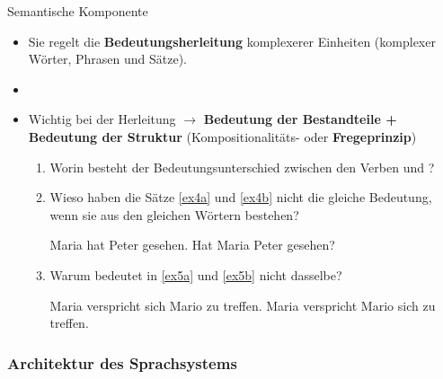 \begin{frame}{Semantische Komponente}
	
	\begin{itemize}
		\item Sie regelt die \textbf{Bedeutungsherleitung} komplexerer Einheiten (komplexer Wörter, Phrasen und Sätze).
		\item[]
		\item<2-> Wichtig bei der Herleitung $\rightarrow$ \textbf{Bedeutung der Bestandteile + Bedeutung der Struktur} (Kompositionalitäts- oder \textbf{Fregeprinzip})
				
		\begin{enumerate}
			\item<3->[$\rightarrow$] Worin besteht der Bedeutungsunterschied zwischen den Verben  und ?
			\item<4->[$\rightarrow$] Wieso haben die Sätze \ref{ex4a} und \ref{ex4b} nicht die gleiche Bedeutung, wenn sie aus den gleichen Wörtern bestehen?

\eal	
	\ex Maria hat Peter gesehen. \label{ex4a}
	\ex Hat Maria Peter gesehen? \label{ex4b}
\zl

			\item<5->[$\rightarrow$] Warum bedeutet  in \ref{ex5a} und \ref{ex5b} nicht dasselbe?
	
\eal
	\ex Maria verspricht sich Mario zu treffen. \label{ex5a}
	\ex Maria verspricht Mario sich zu treffen. \label{ex5b}
\zl

		\end{enumerate}
		
	\end{itemize}
	
\end{frame}


%
\subsubsection{Architektur des Sprachsystems}
%
		
